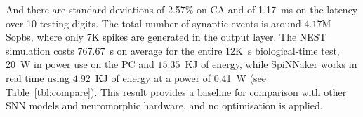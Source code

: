 And there are standard deviations of 2.57\% on CA and of 1.17~ms on the latency over 10 testing digits.
The total number of synaptic events is around $4.17$M Sopbs, where only 7K spikes are generated in the output layer. 
The NEST simulation costs 767.67~s on average for the entire 12K~s biological-time test, 20~W in power use on the PC and $15.35$~KJ of energy, while SpiNNaker works in real time using $4.92$~KJ of energy at a power of 0.41~W (see Table~\ref{tbl:compare}).
This result provides a baseline for comparison with other SNN models and neuromorphic hardware, and no optimisation is applied.


